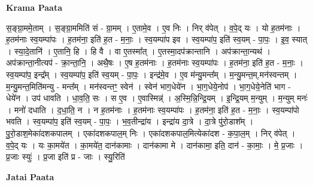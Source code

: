 \documentclass[17pt]{extarticle}
\begin{document}
\textbf{Krama Paata} \newline

स॒ङ्ग्रा॒ममे॒ताम् । स॒ङ्ग्रा॒ममिति॑ सं - ग्रा॒मम् । ए॒तामे॒व । ए॒व निः । निर् व॑पेत् । व॒पे॒द् यः । यो ह॒तम॑नाः । ह॒तम॑नाः स्व॒यम्पा॑पः । ह॒तम॑ना॒ इति॑ ह॒त - म॒नाः॒ । स्व॒यम्पा॑प इव । स्व॒यम्पा॑प॒ इति॑ स्व॒यम् - पा॒पः॒ । इ॒व॒ स्यात् । स्या॒दे॒तानि॑ । ए॒तानि॒ हि । हि वै । वा ए॒तस्मा᳚त् । ए॒तस्मा॒दप॑क्रान्तानि । अप॑क्रान्ता॒न्यथ॑ । अप॑क्रान्ता॒नीत्यप॑ - क्रा॒न्ता॒नि॒ । अथै॒षः । ए॒ष ह॒तम॑नाः । ह॒तम॑नाः स्व॒यम्पा॑पः । ह॒तम॑ना॒ इति॑ ह॒त - म॒नाः॒ । स्व॒यम्पा॑प॒ इन्द्र᳚म् । स्व॒यम्पा॑प॒ इति॑ स्व॒यम् - पा॒पः॒ । इन्द्र॑मे॒व । ए॒व म॑न्यु॒मन्त᳚म् । म॒न्यु॒मन्त॒म्,मन॑स्वन्तम् । म॒न्यु॒मन्त॒मिति॑मन्यु - मन्त᳚म् । मन॑स्वन्तꣳ॒॒ स्वेन॑ । स्वेन॑ भाग॒धेये॑न । भा॒ग॒धेये॒नोप॑ । भा॒ग॒धेये॒नेति॑ भाग - धेये॑न । उप॑ धावति । धा॒व॒ति॒ सः । स ए॒व । ए॒वास्मिन्न्॑ । अ॒स्मि॒न्नि॒न्द्रि॒यम् । इ॒न्द्रि॒यम् म॒न्युम् । म॒न्युम् मनः॑ । मनो॑ दधाति । द॒धा॒ति॒ न । न ह॒तम॑नाः । ह॒तम॑नाः स्व॒यम्पा॑पः । ह॒तम॑ना॒ इति॑ ह॒त - म॒नाः॒ । स्व॒यम्पा॑पो भवति । स्व॒यम्पा॑प॒ इति॑ स्व॒यम् - पा॒पः॒ । भ॒व॒तीन्द्रा॑य । इन्द्रा॑य दा॒त्रे । दा॒त्रे पु॑रो॒डाश᳚म् । पु॒रो॒डाश॒मेका॑दशकपालम् । एका॑दशकपाल॒म् निः । एका॑दशकपाल॒मित्येका॑दश - क॒पा॒ल॒म् । निर् व॑पेत् । व॒पे॒द् यः । यः का॒मये॑त । का॒मये॑त॒ दान॑कामाः । दान॑कामा मे । दान॑कामा॒ इति॒ दान॑ - का॒माः॒ । मे॒ प्र॒जाः । प्र॒जाः स्युः॑ । प्र॒जा इति॑ प्र - जाः । स्यु॒रिति॑ \newline

\textbf{Jatai Paata} \newline
\end{document}

